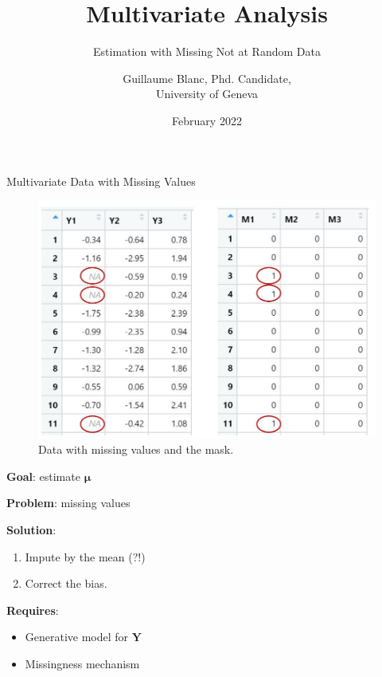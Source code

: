\documentclass[aspectratio=169,xcolor=dvipsnames]{beamer}
\title[short title]{Multivariate Analysis}
\subtitle{Estimation with Missing Not at Random Data}
\author[GB] {Guillaume Blanc, Phd. Candidate, \\ University of Geneva}
\date{{\large February 2022}} %
\begin{document}
\begin{frame}
    \titlepage
\end{frame}


\begin{frame}{Multivariate Data with Missing Values}
    \noindent\begin{minipage}[t]{0.65\linewidth}
    \begin{figure}
        \centering
        \includegraphics[width=.85\textwidth]{images/missin_ex.JPG}
        \caption{Data with missing values and the mask.}
    \end{figure}
    \end{minipage}
    \noindent\begin{minipage}[t]{0.33\linewidth}
        \fontsize{11pt}{15}\selectfont
        \vspace{.3cm}
        \noindent
        \textbf{Goal}: estimate $\bm\mu$

        \noindent
        \textbf{Problem}: missing values

        \vspace{1cm}
        \noindent
        \textbf{Solution}: 
        \begin{enumerate}
            \item Impute by the mean (?!)
            \item Correct the bias.
        \end{enumerate}

        \noindent
        \textbf{Requires}:
        \begin{itemize}%
            \item Generative model for $\bm Y$
            \item Missingness mechanism
        \end{itemize}
    \end{minipage}
\end{frame}
\end{document}
